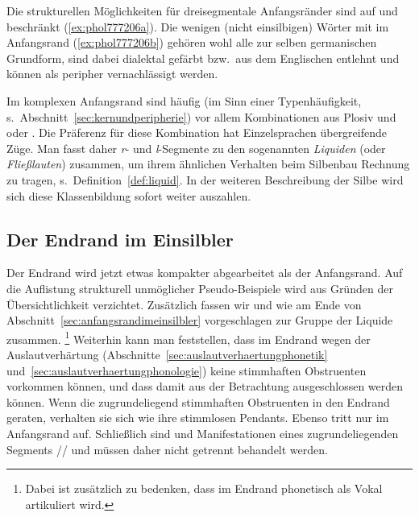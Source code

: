 Die strukturellen Möglichkeiten für dreisegmentale Anfangsränder sind auf \textipa{[SpK]} und \textipa{[StK]} beschränkt (\ref{ex:phol777206a}).
Die wenigen (nicht einsilbigen) Wörter mit \textipa{[Spl]} im Anfangsrand (\ref{ex:phol777206b}) gehören wohl alle zur selben germanischen Grundform, sind dabei dialektal gefärbt bzw.\ aus dem Englischen entlehnt und können als peripher vernachlässigt werden.

\begin{exe}
  \ex\label{ex:phol777206}
  \begin{xlist}
  \end{xlist}
\end{exe}

Im komplexen Anfangsrand sind häufig (im Sinn einer Typenhäufigkeit, s.\ Abschnitt~\ref{sec:kernundperipherie}) vor allem Kombinationen aus Plosiv und \textipa{[K]} oder \textipa{[l]}.
Die Präferenz für diese Kombination hat Einzelsprachen übergreifende Züge.
Man fasst daher \textit{r}- und \textit{l}-Segmente zu den sogenannten \textit{Liquiden} (oder \textit{Fließlauten}) zusammen, um ihrem ähnlichen Verhalten beim Silbenbau Rechnung zu tragen, s.\ Definition~\ref{def:liquid}.
In der weiteren Beschreibung der Silbe wird sich diese Klassenbildung sofort weiter auszahlen.


\subsection{Der Endrand im Einsilbler}

\label{sec:endrandimeinsilbler}

Der Endrand wird jetzt etwas kompakter abgearbeitet als der Anfangsrand.
Auf die Auflistung strukturell unmöglicher Pseudo-Beispiele wird aus Gründen der Übersichtlichkeit verzichtet.
Zusätzlich fassen wir \textipa{[l]} und \textipa{[K]} wie am Ende von Abschnitt~\ref{sec:anfangsrandimeinsilbler} vorgeschlagen zur Gruppe der Liquide zusammen.%
\footnote{Dabei ist zusätzlich zu bedenken, dass \textipa{[K]} im Endrand phonetisch als Vokal artikuliert wird.}
Weiterhin kann man feststellen, dass im Endrand wegen der Auslautverhärtung (Abschnitte~\ref{sec:auslautverhaertungphonetik} und~\ref{sec:auslautverhaertungphonologie}) keine stimmhaften Obstruenten vorkommen können, und dass damit \textipa{[b d g v z J]} aus der Betrachtung ausgeschlossen werden können.
Wenn die zugrundeliegend stimmhaften Obstruenten in den Endrand geraten, verhalten sie sich wie ihre stimmlosen Pendants.
Ebenso tritt \textipa{[h]} nur im Anfangsrand auf.
Schließlich sind \textipa{[\c{c}]} und \textipa{[X]} Manifestationen eines zugrundeliegenden Segments // und müssen daher nicht getrennt behandelt werden.

